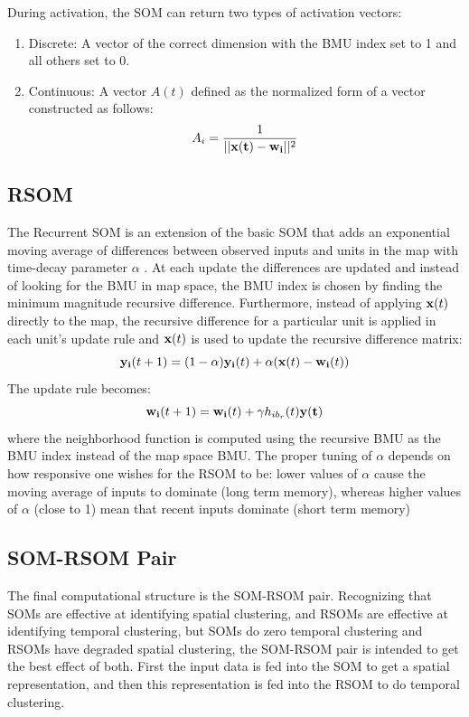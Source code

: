 \documentclass[a4paper,10pt]{article}
\begin{document}
During activation, the SOM can return two types of activation vectors:
\begin{enumerate}
\item Discrete: A vector of the correct dimension with the BMU index set to 1 and all others set
to 0.
\item Continuous: A vector $A(t)$ defined as the normalized form of a vector constructed as follows:
\begin{equation}
 A_i = \frac{1}{||\bold{x(t)} - \bold{w_i}||^2}
\end{equation}
\end{enumerate}


\subsection{RSOM}
The Recurrent SOM is an extension of the basic SOM that adds an exponential moving average of
differences between observed inputs and units in the map with time-decay parameter $\alpha$ . At
each update the differences are updated and instead of looking for the BMU in map space, the BMU
index is chosen by finding the minimum magnitude recursive difference. Furthermore, instead of
applying $\bold{x}(t)$ directly to the map, the recursive difference for a particular unit is
applied in each unit's update rule and $\bold{x}(t)$ is used to update the recursive difference
matrix:
\begin{equation}
 \bold{y_i}(t+1) = (1-\alpha)\bold{y_i}(t)+\alpha(\bold{x}(t)-\bold{w_i}(t))
\end{equation}
The update rule becomes:
 \begin{equation} \label{eq:RUPDATE}
 \bold{w_{i}}(t+1) = \bold{w_i}(t) + \gamma h_{ib_r}(t)\bold{y(t)}
\end{equation}
where the neighborhood function is computed using the recursive BMU as the BMU index instead of the
map space BMU.  The proper tuning of $\alpha$ depends on how responsive one wishes for the RSOM to
be: lower values of $\alpha$ cause the moving average of inputs to dominate (long term memory),
whereas higher values of $\alpha$ (close to 1) mean that recent inputs dominate (short term memory)

\subsection{SOM-RSOM Pair}
The final computational structure is the SOM-RSOM pair.  Recognizing that SOMs are effective at
identifying spatial clustering, and RSOMs are effective at identifying temporal clustering, but
SOMs do zero temporal clustering and RSOMs have degraded spatial clustering, the SOM-RSOM pair is
intended to get the best effect of both.  First the input data is fed into the SOM to get a spatial
representation, and then this representation is fed into the RSOM to do temporal clustering. 
\end{document}
